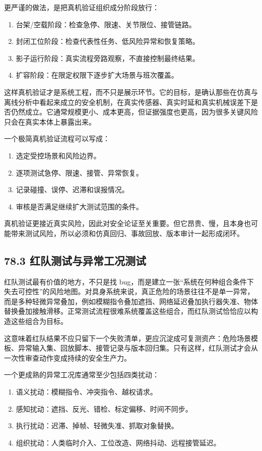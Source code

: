 更严谨的做法，是把真机验证组织成分阶段放行：

\begin{enumerate}
\item 台架/空载阶段：检查急停、限速、关节限位、接管链路。
\item 封闭工位阶段：检查代表性任务、低风险异常和恢复策略。
\item 影子运行阶段：真实流程旁路观察，不直接控制最终结果。
\item 扩容阶段：在限定权限下逐步扩大场景与班次覆盖。
\end{enumerate}

这样真机验证才是系统工程，而不只是展示环节。它的目标，是确认那些在仿真与离线分析中看起来成立的安全机制，在真实传感器、真实时延和真实机械误差下是否仍然成立。它通常规模更小、成本更高，但证据强度也更高，因为很多关键风险只会在真实本体上暴露出来。

一个极简真机验证流程可以写成：

\begin{enumerate}
\item 选定受控场景和风险边界。
\item 逐项测试急停、限速、接管、异常恢复。
\item 记录碰撞、误停、迟滞和误报情况。
\item 审核是否满足继续扩大测试范围的条件。
\end{enumerate}

真机验证更接近真实风险，因此对安全论证至关重要。但它昂贵、慢，且本身也可能带来测试风险，所以必须和仿真回归、事故回放、版本审计一起形成闭环。

\subsection*{78.3 红队测试与异常工况测试}


红队测试最有价值的地方，不只是找 bug，而是建立一张“系统在何种组合条件下失去可控性”的风险地图。对具身系统来说，真正危险的场景往往不是单一异常，而是多种轻微异常叠加，例如模糊指令叠加遮挡、网络延迟叠加执行器失准、物体替换叠加接触滑移。正常测试流程很难系统覆盖这些组合，而红队测试恰恰应以构造这些组合为目标。

这意味着红队结果不应只留下一个失败清单，更应沉淀成可复测资产：危险场景模板、异常输入集、回放脚本、接管记录与版本回归集。只有这样，红队测试才会从一次性审查动作变成持续的安全生产力。

一个更成熟的异常工况库通常至少包括四类扰动：

\begin{enumerate}
\item 语义扰动：模糊指令、冲突指令、越权请求。
\item 感知扰动：遮挡、反光、错检、标定偏移、时间不同步。
\item 执行扰动：迟滞、掉帧、轻微失准、抓取对象替换。
\item 组织扰动：人类临时介入、工位改造、网络抖动、远程接管延迟。
\end{enumerate}

